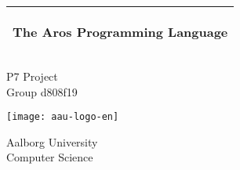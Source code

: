 \begin{titlepage}
  \noindent%
  \begin{tabular}{@{}p{\textwidth}@{}}
    \toprule[2pt]
    \midrule
    \vspace{0.2cm}
    \begin{center}
    \LARGE{\textbf{
      The Aros Programming Language%
    }}
    \end{center}
    \vspace{0.2cm}\\
    \midrule
    \toprule[2pt]
  \end{tabular}
  \vspace{4 cm}
  \begin{center}
    \vspace{0.2cm}
    {\Large
     P7 Project\\Group d808f19 %
      \break
      
      \texttt{[image: aau-logo-en]}
    }
  \end{center}
  \vfill
  \begin{center}
  Aalborg University\\
  Computer Science
  \end{center}
\end{titlepage}
\cleardoublepage
